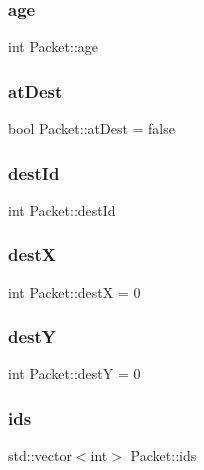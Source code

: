 \subsubsection{\texorpdfstring{age}{age}}
{\footnotesize\ttfamily int Packet\+::age}

\hypertarget{struct_packet_aff40251851843edda40aeaab9bf1f53e}{}\label{struct_packet_aff40251851843edda40aeaab9bf1f53e} 
\subsubsection{\texorpdfstring{at\+Dest}{atDest}}
{\footnotesize\ttfamily bool Packet\+::at\+Dest = false}

\hypertarget{struct_packet_a874f1ca82309f2bd71c50cb3cc8ef6da}{}\label{struct_packet_a874f1ca82309f2bd71c50cb3cc8ef6da} 
\subsubsection{\texorpdfstring{dest\+Id}{destId}}
{\footnotesize\ttfamily int Packet\+::dest\+Id}

\hypertarget{struct_packet_ab7e35436e4e613479fae8e00ca3c5e67}{}\label{struct_packet_ab7e35436e4e613479fae8e00ca3c5e67} 
\subsubsection{\texorpdfstring{destX}{destX}}
{\footnotesize\ttfamily int Packet\+::destX = 0}

\hypertarget{struct_packet_a261c41f20f9f63c178db8d11f0b75c02}{}\label{struct_packet_a261c41f20f9f63c178db8d11f0b75c02} 
\subsubsection{\texorpdfstring{destY}{destY}}
{\footnotesize\ttfamily int Packet\+::destY = 0}

\hypertarget{struct_packet_a0a31a723ea909e09df5ad91ab6cae52a}{}\label{struct_packet_a0a31a723ea909e09df5ad91ab6cae52a} 
\subsubsection{\texorpdfstring{ids}{ids}}
{\footnotesize\ttfamily std\+::vector$<$int$>$ Packet\+::ids}

